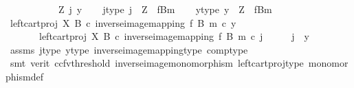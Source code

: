 \begin{isabellebody}
\ \ \ \ \isamarkupfalse%
\isanewline
\ \ \isamarkupfalse%
\isanewline
{}\isamarkupfalse%
\isanewline
\ \ \isamarkupfalse%
\ Z\ j\ y\isanewline
\ \ \isamarkupfalse%
\ j{\isacharunderscore}{\kern0pt}type{\isacharcolon}{\kern0pt}\ {\isachardoublequoteopen}j\ {\isacharcolon}{\kern0pt}\ Z\ {\isasymrightarrow}\ {\isacharparenleft}{\kern0pt}f\isactrlsup {\isacharminus}{\kern0pt}B{\isasymrparr}\isactrlbsub m\isactrlesub {\isacharparenright}{\kern0pt}{\isachardoublequoteclose}\isanewline
\ \ \isamarkupfalse%
\ y{\isacharunderscore}{\kern0pt}type{\isacharcolon}{\kern0pt}\ {\isachardoublequoteopen}y\ {\isacharcolon}{\kern0pt}\ Z\ {\isasymrightarrow}\ {\isacharparenleft}{\kern0pt}f\isactrlsup {\isacharminus}{\kern0pt}B{\isasymrparr}\isactrlbsub m\isactrlesub {\isacharparenright}{\kern0pt}{\isachardoublequoteclose}\isanewline
\ \ \isamarkupfalse%
\ {\isachardoublequoteopen}{\isacharparenleft}{\kern0pt}left{\isacharunderscore}{\kern0pt}cart{\isacharunderscore}{\kern0pt}proj\ X\ B\ {\isasymcirc}\isactrlsub c\ inverse{\isacharunderscore}{\kern0pt}image{\isacharunderscore}{\kern0pt}mapping\ f\ B\ m{\isacharparenright}{\kern0pt}\ {\isasymcirc}\isactrlsub c\ y\ {\isacharequal}{\kern0pt}\isanewline
\ \ \ \ \ \ \ {\isacharparenleft}{\kern0pt}left{\isacharunderscore}{\kern0pt}cart{\isacharunderscore}{\kern0pt}proj\ X\ B\ {\isasymcirc}\isactrlsub c\ inverse{\isacharunderscore}{\kern0pt}image{\isacharunderscore}{\kern0pt}mapping\ f\ B\ m{\isacharparenright}{\kern0pt}\ {\isasymcirc}\isactrlsub c\ j{\isachardoublequoteclose}\isanewline
\ \ \isamarkupfalse%
\ \isamarkupfalse%
\ {\isachardoublequoteopen}j\ {\isacharequal}{\kern0pt}\ y{\isachardoublequoteclose}\isanewline
\ \ \ \ \isamarkupfalse%
\ assms\ j{\isacharunderscore}{\kern0pt}type\ y{\isacharunderscore}{\kern0pt}type\ inverse{\isacharunderscore}{\kern0pt}image{\isacharunderscore}{\kern0pt}mapping{\isacharunderscore}{\kern0pt}type\ comp{\isacharunderscore}{\kern0pt}type\isanewline
\ \ \ \ \isamarkupfalse%
\ {\isacharparenleft}{\kern0pt}smt\ {\isacharparenleft}{\kern0pt}verit{\isacharcomma}{\kern0pt}\ ccfv{\isacharunderscore}{\kern0pt}threshold{\isacharparenright}{\kern0pt}\ inverse{\isacharunderscore}{\kern0pt}image{\isacharunderscore}{\kern0pt}monomorphism\ left{\isacharunderscore}{\kern0pt}cart{\isacharunderscore}{\kern0pt}proj{\isacharunderscore}{\kern0pt}type\ monomorphism{\isacharunderscore}{\kern0pt}def{}{\isacharparenright}{\kern0pt}\isanewline

\end{isabellebody}
